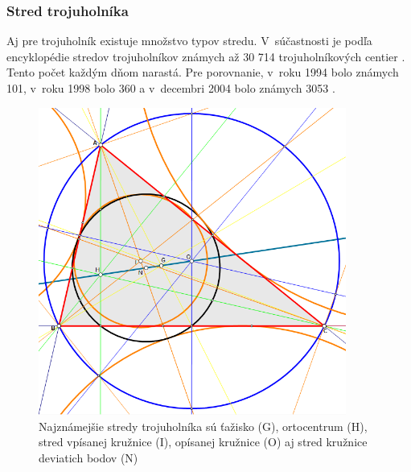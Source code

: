 

\subsubsection{Stred trojuholníka}
Aj pre trojuholník existuje množstvo typov stredu. V~súčastnosti je podľa encyklopédie stredov trojuholníkov známych až 30 714 trojuholníkových centier \cite{kimberling_2019}. Tento počet každým dňom narastá. Pre porovnanie, v~roku 1994 bolo známych 101, v~roku 1998 bolo 360 a v~decembri 2004 bolo známych 3053 \cite{Kimberling_Center_2004}.


\begin{figure}[H]
	\centering
	\includegraphics[width=0.9\textwidth]{obrazky-figures/Trigonometric_centres.png}
	\caption{Najznámejšie stredy trojuholníka sú ťažisko (G), ortocentrum (H), stred vpísanej kružnice (I), opísanej kružnice (O) aj stred kružnice deviatich bodov (N) 
    \protect\footnotemark
    }
	\label{fig:TriangleCenters}
\end{figure}

